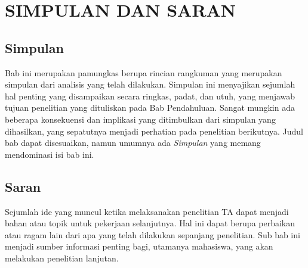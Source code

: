 \chapter{SIMPULAN DAN SARAN}

\section{Simpulan}
\noindent Bab ini merupakan pamungkas berupa rincian rangkuman yang merupakan simpulan dari analisis yang telah dilakukan. Simpulan ini menyajikan sejumlah hal penting yang disampaikan secara ringkas, padat, dan utuh, yang menjawab tujuan penelitian yang dituliskan pada Bab Pendahuluan. Sangat mungkin   ada beberapa konsekuensi dan implikasi yang ditimbulkan dari simpulan yang dihasilkan, yang sepatutnya menjadi perhatian pada penelitian berikutnya. Judul bab dapat disesuaikan, namun umumnya ada \textit{Simpulan} yang memang mendominasi isi bab ini.

\section{Saran}
\noindent Sejumlah ide yang muncul ketika melaksanakan penelitian TA dapat menjadi bahan atau topik untuk pekerjaan selanjutnya. Hal ini dapat berupa perbaikan atau ragam lain dari apa yang telah dilakukan sepanjang penelitian. Sub bab ini menjadi sumber informasi penting bagi, utamanya mahasiswa, yang akan melakukan penelitian lanjutan.